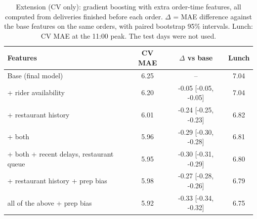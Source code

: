 \begin{table}[t]
\centering
\caption{Extension (CV only): gradient boosting with extra order-time features, all computed from deliveries finished before each order. $\Delta$ = MAE difference against the base features on the same orders, with paired bootstrap 95\% intervals. Lunch: CV MAE at the 11:00 peak. The test days were not used.}
\label{tab:extension}
\small
\begin{tabular}{@{}p{}ccc@{}}
\toprule
Features & CV MAE & $\Delta$ vs base & Lunch \\
\midrule
Base (final model) & 6.25 & -- & 7.04 \\
+ rider availability & 6.20 & -0.05 [-0.05, -0.05] & 7.04 \\
+ restaurant history & 6.01 & -0.24 [-0.25, -0.23] & 6.82 \\
+ both & 5.96 & -0.29 [-0.30, -0.28] & 6.81 \\
+ both + recent delays, restaurant queue & 5.95 & -0.30 [-0.31, -0.29] & 6.80 \\
+ restaurant history + prep bias & 5.98 & -0.27 [-0.28, -0.26] & 6.79 \\
all of the above + prep bias & 5.92 & -0.33 [-0.34, -0.32] & 6.75 \\
\bottomrule
\end{tabular}
\end{table}
